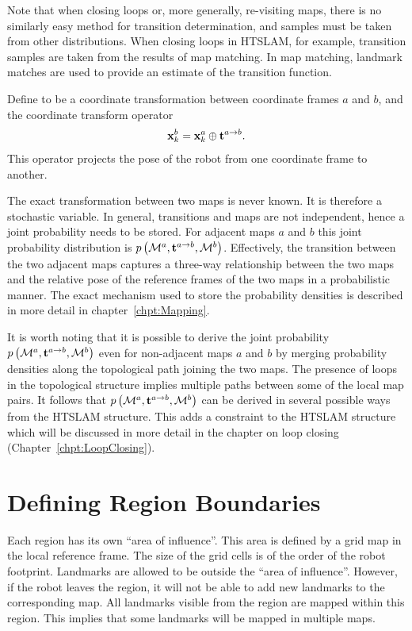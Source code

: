 Note that when closing loops or, more generally, re-visiting maps,
there is no similarly easy method for transition determination, and samples
must be taken from other distributions. When closing
loops in HTSLAM, for example, transition samples are taken from the results of map
matching. In map matching, landmark matches are used to provide an estimate of
the transition function.

Define  to be a coordinate transformation between
coordinate frames $a$ and $b$, and the coordinate transform operator
\transit\ 
\begin{equation}
\x{k}{}{b} = \x{k}{}{a} \transit \tr{}{a}{b}.
\end{equation}
This operator projects the pose of the robot from one coordinate frame to
another.

The exact transformation between two maps is never known. It is
therefore a stochastic variable. In general, transitions and maps are
not independent, hence a joint probability needs to be stored. For
adjacent maps $a$ and $b$ this joint probability distribution is
$\prob{\map{}{}{a},\tr{}{a}{b}, \map{}{}{b}}$. Effectively,
the transition between the two adjacent maps captures a three-way
relationship between the two maps and the relative pose of the
reference frames of the two maps in a probabilistic manner. The exact
mechanism used to store the probability densities is described in more
detail in chapter~\ref{chpt:Mapping}.

It is worth noting that it is possible to derive the joint probability
$\prob{\map{}{}{a},\tr{}{a}{b},\map{}{}{b}}$ even for non-adjacent
maps $a$ and $b$ by merging probability densities along the
topological path joining the two maps.  The presence of loops in the
topological structure implies multiple paths between some of the local
map pairs. It follows that
$\prob{\map{}{}{a},\tr{}{a}{b},\map{}{}{b}}$ can be derived in several
possible ways from the HTSLAM structure. This adds a constraint to the
HTSLAM structure which will be discussed in more detail in the chapter
on loop closing (Chapter~\ref{chpt:LoopClosing}).




\section{Defining Region Boundaries}
\label{sec:region}

Each region has its own ``area of influence''. This area is defined by
a grid map in the local reference frame. The size of the grid cells is
of the order of the robot footprint. Landmarks are allowed to be
outside the ``area of influence''. However, if the robot leaves the
region, it will not be able to add new landmarks to the corresponding
map. All landmarks visible from the region are mapped within
this region. This implies that some landmarks will be mapped in
multiple maps.

